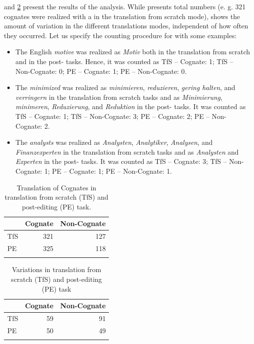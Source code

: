 \documentclass[output=paper]{LSP/langsci}
\begin{document}
 and \ref{hansenschirraetal:tab:4} present the results of the  analysis. While  presents total numbers (e. g. 321 cognates were realized with a  in the translation from scratch mode),  shows the amount of variation in the different translations modes, independent of how often they occurred. Let us specify the counting procedure for  with some examples:

\begin{itemize}
\item The English  \textit{motive} was realized as \textit{Motiv} both in the translation from scratch and in the post- tasks. Hence, it was counted as TfS – Cognate: 1; TfS – Non-Cognate: 0; PE – Cognate: 1; PE – Non-Cognate: 0.
\item The  \textit{minimized} was realized as \textit{minimieren}, \textit{reduzieren}, \textit{gering halten}, and \textit{verringern} in the translation from scratch tasks and as \textit{Minimie\-rung}, \textit{minimeren}, \textit{Reduzierung}, and \textit{Reduktion} in the post- tasks. It was counted as TfS – Cognate: 1; TfS – Non-Cognate: 3; PE – Cognate: 2; PE – Non-Cognate: 2.
\item The  \textit{analysts} was realized as \textit{Analysten}, \textit{Analytiker}, \textit{Analysen}, and \textit{Finanzexperten} in the translation from scratch tasks and as \textit{Analysten} and \textit{Experten} in the post- tasks. It was counted as TfS – Cognate: 3; TfS – Non-Cognate: 1; PE – Cognate: 1; PE – Non-Cognate: 1.
\end{itemize}

\begin{table}
\caption{Translation of Cognates in translation from scratch (TfS) and post-editing (PE) task.}
\label{hansenschirraetal:tab:3}
\begin{tabularx}{.8\linewidth}{Xrr}
\lsptoprule
            & Cognate     & Non-Cognate \\ \midrule
TfS & 321 & 127 \\
PE & 325 & 118 \\
\lspbottomrule
\end{tabularx}
\end{table}

\begin{table}
\caption{Variations in translation from scratch (TfS) and post-editing (PE) task}
\label{hansenschirraetal:tab:4}
\begin{tabularx}{.8\linewidth}{Xrr}
\lsptoprule
    & Cognate & Non-Cognate \\ \midrule
TfS & 59 & 91 \\
PE & 50 & 49 \\ 
\lspbottomrule
\end{tabularx}
\end{table}
\end{document}
